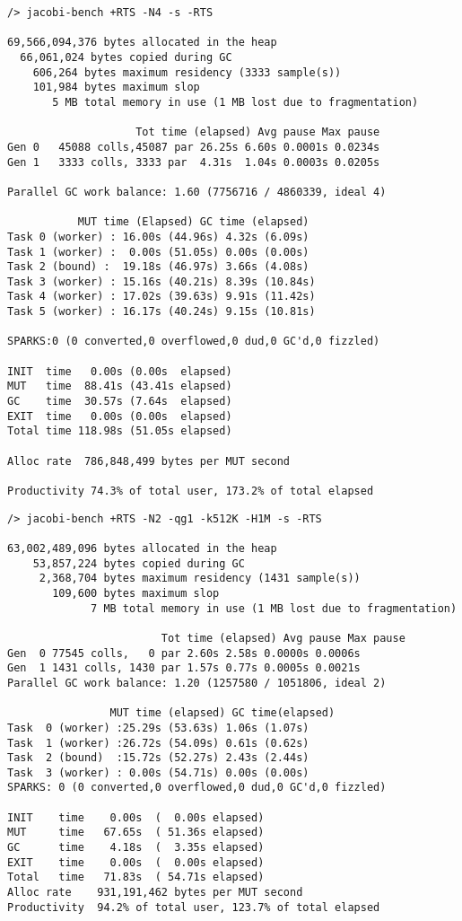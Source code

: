 \documentclass{tmr}
\begin{document}
\begin{lstlisting}[float,captionpos=b,belowcaptionskip=4pt, caption=Haskell test run 1]
/> jacobi-bench +RTS -N4 -s -RTS

69,566,094,376 bytes allocated in the heap
  66,061,024 bytes copied during GC
    606,264 bytes maximum residency (3333 sample(s))
    101,984 bytes maximum slop
       5 MB total memory in use (1 MB lost due to fragmentation)

                    Tot time (elapsed) Avg pause Max pause
Gen 0   45088 colls,45087 par 26.25s 6.60s 0.0001s 0.0234s
Gen 1   3333 colls, 3333 par  4.31s  1.04s 0.0003s 0.0205s

Parallel GC work balance: 1.60 (7756716 / 4860339, ideal 4)

           MUT time (Elapsed) GC time (elapsed)
Task 0 (worker) : 16.00s (44.96s) 4.32s (6.09s)
Task 1 (worker) :  0.00s (51.05s) 0.00s (0.00s)
Task 2 (bound) :  19.18s (46.97s) 3.66s (4.08s)
Task 3 (worker) : 15.16s (40.21s) 8.39s (10.84s)
Task 4 (worker) : 17.02s (39.63s) 9.91s (11.42s)
Task 5 (worker) : 16.17s (40.24s) 9.15s (10.81s)

SPARKS:0 (0 converted,0 overflowed,0 dud,0 GC'd,0 fizzled)

INIT  time   0.00s (0.00s  elapsed)
MUT   time  88.41s (43.41s elapsed)
GC    time  30.57s (7.64s  elapsed)
EXIT  time   0.00s (0.00s  elapsed)
Total time 118.98s (51.05s elapsed)

Alloc rate  786,848,499 bytes per MUT second

Productivity 74.3% of total user, 173.2% of total elapsed

\end{lstlisting}

\begin{lstlisting}[float,captionpos=b,belowcaptionskip=4pt, caption=Haskell test run 2]
/> jacobi-bench +RTS -N2 -qg1 -k512K -H1M -s -RTS

63,002,489,096 bytes allocated in the heap
    53,857,224 bytes copied during GC
     2,368,704 bytes maximum residency (1431 sample(s))
       109,600 bytes maximum slop
             7 MB total memory in use (1 MB lost due to fragmentation)

                        Tot time (elapsed) Avg pause Max pause
Gen  0 77545 colls,   0 par 2.60s 2.58s 0.0000s 0.0006s
Gen  1 1431 colls, 1430 par 1.57s 0.77s 0.0005s 0.0021s
Parallel GC work balance: 1.20 (1257580 / 1051806, ideal 2)

                MUT time (elapsed) GC time(elapsed)
Task  0 (worker) :25.29s (53.63s) 1.06s (1.07s)
Task  1 (worker) :26.72s (54.09s) 0.61s (0.62s)
Task  2 (bound)  :15.72s (52.27s) 2.43s (2.44s)
Task  3 (worker) : 0.00s (54.71s) 0.00s (0.00s)
SPARKS: 0 (0 converted,0 overflowed,0 dud,0 GC'd,0 fizzled)

INIT    time    0.00s  (  0.00s elapsed)
MUT     time   67.65s  ( 51.36s elapsed)
GC      time    4.18s  (  3.35s elapsed)
EXIT    time    0.00s  (  0.00s elapsed)
Total   time   71.83s  ( 54.71s elapsed)
Alloc rate    931,191,462 bytes per MUT second
Productivity  94.2% of total user, 123.7% of total elapsed

\end{lstlisting}
\end{document}
